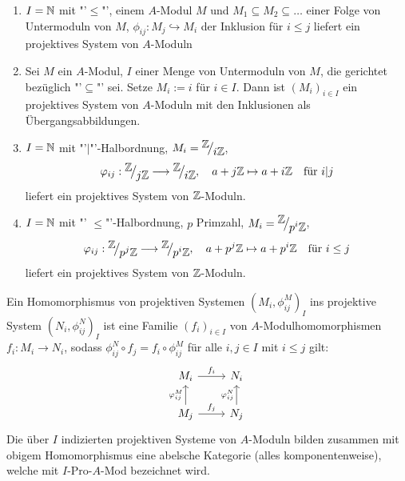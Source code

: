 \begin{bsp} \label{16.18}
	\begin{enumerate} [label = \alph*)]
		\item $I=\mathbb{N}$ mit "'$\leq$"', einem $A$-Modul $M$ und $M_1 \subseteq M_2 \subseteq \ldots $ einer Folge von Untermoduln von $M$, $\phi_{ij}:M_j \hookrightarrow M_i$ der Inklusion für $i\leq j$ liefert ein projektives System von $A$-Moduln
		\item Sei $M$ ein $A$-Modul, $I$ einer Menge von Untermoduln von $M$, die gerichtet bezüglich "'$\subseteq$"' sei. Setze $M_i:= i$ für $i\in I$. Dann ist $(M_i)_{i\in I}$ ein projektives System von $A$-Moduln mit den Inklusionen als Übergangsabbildungen.
		\item $I=\mathbb{N}$ mit "'$\big| $"'-Halbordnung, $M_i= \QR{\Z}{i\Z}$, 
		$$\phi_{ij}:\QR{\Z}{j\Z} \longrightarrow \QR{\Z}{i\Z}, \quad a+ j\Z \mapsto a + i\Z \quad \text{für } i|j$$ liefert ein projektives System von $\mathbb{Z}$-Moduln.
		\item $I=\mathbb{N}$ mit "' $\leq $"'-Halbordnung, $p$ Primzahl, $M_i= \QR{\Z}{p^{i}\Z}$, 
		$$\phi_{ij}:\QR{\Z}{p^{j}\Z} \longrightarrow \QR{\Z}{p^{i}\Z}, \quad a+ p^{j}\Z \mapsto a + p^{i}\Z \quad \text{für } i \leq j$$ liefert ein projektives System von $\mathbb{Z}$-Moduln.
	\end{enumerate}
\end{bsp}
\begin{bem+df} \label{16.19}
	Ein Homomorphismus von projektiven Systemen $(M_i, \phi_{ij}^M)_I$ ins projektive System $(N_i, \phi_{ij}^N)_I$ ist eine Familie $(f_i)_{i\in I}$ von $A$-Modulhomomorphismen $f_i:M_i \to N_i$, sodass $\phi_{ij}^N \circ f_j = f_i \circ \phi_{ij}^M$ für alle $i,j\in I$ mit $i\leq j$ gilt:
	$$\begin{tikzcd}
	M_i \arrow{r}{f_i} & N_i \\
	M_j \arrow{r}{f_j} \arrow{u}{\phi_{ij}^M} & N_j \arrow{u}{\phi_{ij}^N}
	\end{tikzcd}$$
	Die über $I$ indizierten projektiven Systeme von $A$-Moduln bilden zusammen mit obigem Homomorphismus eine abelsche Kategorie (alles komponentenweise), welche mit $I$-Pro-$A$-Mod bezeichnet wird.
\end{bem+df}
